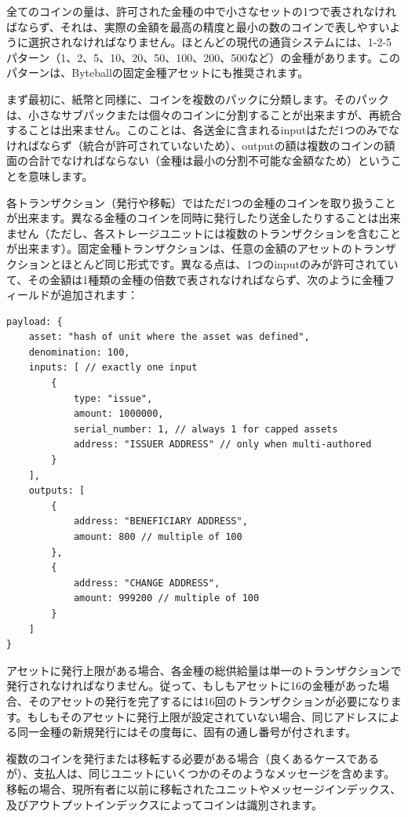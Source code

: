 \documentclass[a4paper, dvipdfmx]{jsarticle}
\begin{document}
全てのコインの量は、許可された金種の中で小さなセットの1つで表されなければならず、それは、実際の金額を最高の精度と最小の数のコインで表しやすいように選択されなければなりません。ほとんどの現代の通貨システムには、1-2-5パターン（1、2、5、10、20、50、100、200、500など）の金種があります。このパターンは、Byteballの固定金種アセットにも推奨されます。

まず最初に、紙幣と同様に、コインを複数のパックに分類します。そのパックは、小さなサブパックまたは個々のコインに分割することが出来ますが、再統合することは出来ません。このことは、各送金に含まれるinputはただ1つのみでなければならず（統合が許可されていないため）、outputの額は複数のコインの額面の合計でなければならない（金種は最小の分割不可能な金額なため）ということを意味します。

各トランザクション（発行や移転）ではただ1つの金種のコインを取り扱うことが出来ます。異なる金種のコインを同時に発行したり送金したりすることは出来ません（ただし、各ストレージユニットには複数のトランザクションを含むことが出来ます）。固定金種トランザクションは、任意の金額のアセットのトランザクションとほとんど同じ形式です。異なる点は、1つのinputのみが許可されていて、その金額は1種類の金種の倍数で表されなければならず、次のように金種フィールドが追加されます：

\begin{lstlisting}[basicstyle=\ttfamily\footnotesize, frame=none]
payload: {
    asset: "hash of unit where the asset was defined",
    denomination: 100,
    inputs: [ // exactly one input
        {
            type: "issue",
            amount: 1000000,
            serial_number: 1, // always 1 for capped assets
            address: "ISSUER ADDRESS" // only when multi-authored
        }
    ],
    outputs: [
        {
            address: "BENEFICIARY ADDRESS",
            amount: 800 // multiple of 100
        },
        {
            address: "CHANGE ADDRESS",
            amount: 999200 // multiple of 100
        }
    ]
}
\end{lstlisting}

\noindent アセットに発行上限がある場合、各金種の総供給量は単一のトランザクションで発行されなければなりません。従って、もしもアセットに16の金種があった場合、そのアセットの発行を完了するには16回のトランザクションが必要になります。もしもそのアセットに発行上限が設定されていない場合、同じアドレスによる同一金種の新規発行にはその度毎に、固有の通し番号が付されます。

複数のコインを発行または移転する必要がある場合（良くあるケースであるが）、支払人は、同じユニットにいくつかのそのようなメッセージを含めます。移転の場合、現所有者に以前に移転されたユニットやメッセージインデックス、及びアウトプットインデックスによってコインは識別されます。
\end{document}
